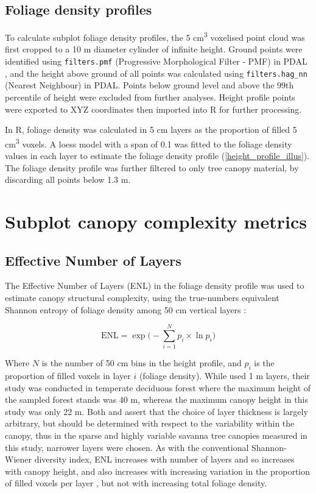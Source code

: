 \documentclass[11pt,a4paper]{article}
\begin{document}
\subsection{Foliage density profiles}

To calculate subplot foliage density profiles, the 5 cm\textsuperscript{3} voxelised point cloud was first cropped to a 10 m diameter cylinder of infinite height. Ground points were identified using \texttt{filters.pmf} (Progressive Morphological Filter - PMF) in PDAL \citep{Zhang2003}, and the height above ground of all points was calculated using \texttt{filters.hag\_nn} (Nearest Neighbour) in PDAL. Points below ground level and above the 99th percentile of height were excluded from further analyses. Height profile points were exported to XYZ coordinates then imported into R for further processing. 

In R, foliage density was calculated in 5 cm layers as the proportion of filled 5 cm\textsuperscript{3} voxels. A loess model with a span of 0.1 was fitted to the foliage density values in each layer to estimate the foliage density profile (\autoref{height_profile_illus}). The foliage density profile was further filtered to only tree canopy material, by discarding all points below 1.3 m.

\section{Subplot canopy complexity metrics}

\subsection{Effective Number of Layers}

The Effective Number of Layers (ENL) in the foliage density profile was used to estimate canopy structural complexity, using the true-numbers equivalent Shannon entropy of foliage density among 50 cm vertical layers \citep{Ehbrecht2016}:

\begin{equation}
	\text{ENL} = \exp\Big(-\sum_{i=1}^{N} p_{i} \times \ln p_{i} \Big)
\end{equation}

Where $N$ is the number of 50 cm bins in the height profile, and $p_{i}$ is the proportion of filled voxels in layer $i$ (foliage density). While \citet{Ehbrecht2016} used 1 m layers, their study was conducted in temperate deciduous forest where the maximum height of the sampled forest stands was 40 m, whereas the maximum canopy height in this study was only 22 m. Both \citet{Ehbrecht2016} and \citet{Montes2004} assert that the choice of layer thickness is largely arbitrary, but should be determined with respect to the variability within the canopy, thus in the sparse and highly variable savanna tree canopies measured in this study, narrower layers were chosen. As with the conventional Shannon-Wiener diversity index, ENL increases with number of layers and so increases with canopy height, and also increases with increasing variation in the proportion of filled voxels per layer \citep{Jost2006}, but not with increasing total foliage density.
\end{document}
